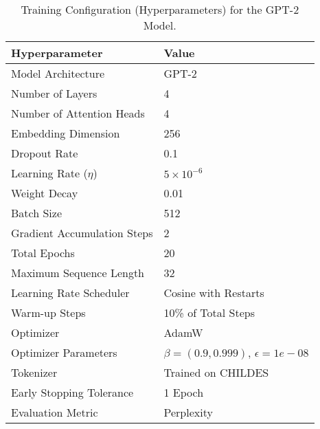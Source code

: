 
\begin{table}[h!]
\centering
\small
\tabcolsep=2pt %
\begin{tabular}{|l|l|}
\hline
\textbf{Hyperparameter}       & \textbf{Value}                  \\ \hline
Model Architecture            & GPT-2     \\ \hline
Number of Layers              & 4                               \\ \hline
Number of Attention Heads     & 4                               \\ \hline
Embedding Dimension           & 256                             \\ \hline
Dropout Rate                  & 0.1                             \\ \hline
Learning Rate (\(\eta\))      & \(5 \times 10^{-6}\)            \\ \hline
Weight Decay                  & 0.01                            \\ \hline
Batch Size                    & 512                             \\ \hline
Gradient Accumulation Steps   & 2                               \\ \hline
Total Epochs                  & 20                              \\ \hline
Maximum Sequence Length       & 32                          \\ \hline
Learning Rate Scheduler       & Cosine with Restarts         \\ \hline
Warm-up Steps                 & 10\% of Total Steps             \\ \hline
Optimizer                     & AdamW                            \\ \hline
Optimizer Parameters          & $\beta = (0.9, 0.999)$, $\epsilon = 1e−08$ \\ \hline
Tokenizer                     & Trained on CHILDES \\ \hline
Early Stopping Tolerance      & 1 Epoch                         \\ \hline
Evaluation Metric             & Perplexity                      \\ \hline
\end{tabular}
\caption{Training Configuration (Hyperparameters) for the GPT-2 Model.}
\label{table:hyperparameters}
\end{table}
